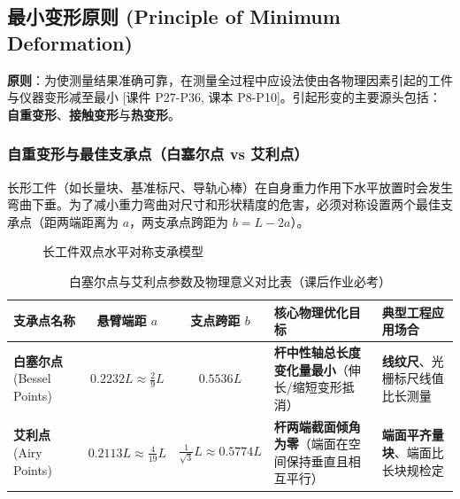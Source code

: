 \documentclass[11pt,a4paper]{ctexart}
\begin{document}
\subsection{最小变形原则 (Principle of Minimum Deformation)}
\textbf{原则}：为使测量结果准确可靠，在测量全过程中应设法使由各物理因素引起的工件与仪器变形减至最小 \hfill\textsf{[课件 P27-P36, 课本 P8-P10]}。引起形变的主要源头包括：\textbf{自重变形}、\textbf{接触变形}与\textbf{热变形}。

\subsubsection{自重变形与最佳支承点（白塞尔点 vs 艾利点）}
长形工件（如长量块、基准标尺、导轨心棒）在自身重力作用下水平放置时会发生弯曲下垂。为了减小重力弯曲对尺寸和形状精度的危害，必须对称设置两个最佳支承点（距两端距离为 $a$，两支承点跨距为 $b = L - 2a$）。

\begin{figure}[htbp]
\centering
{}
\caption{长工件双点水平对称支承模型}
\label{fig:beam_support}
\end{figure}

\begin{table}[htbp]
\centering
\small
\caption{白塞尔点与艾利点参数及物理意义对比表（课后作业必考）}
\label{tab:bessel_airy}
\begin{tabularx}{\textwidth}{l c c p{4.2cm} X}
\toprule
\textbf{支承点名称} & \textbf{悬臂端距 $a$} & \textbf{支点跨距 $b$} & \textbf{核心物理优化目标} & \textbf{典型工程应用场合} \\
\midrule
\textbf{白塞尔点} (Bessel Points) & $0.2232 L \approx \frac{2}{9}L$ & $0.5536 L$ & \textbf{杆中性轴总长度变化量最小}（伸长/缩短变形抵消） & \textbf{线纹尺}、光栅标尺线值比长测量 \\
\textbf{艾利点} (Airy Points) & $0.2113 L \approx \frac{4}{19}L$ & $\frac{1}{\sqrt{3}}L \approx 0.5774 L$ & \textbf{杆两端截面倾角为零}（端面在空间保持垂直且相互平行） & \textbf{端面平齐量块}、端面比长块规检定 \\
\bottomrule
\end{tabularx}
\end{table}
\end{document}
